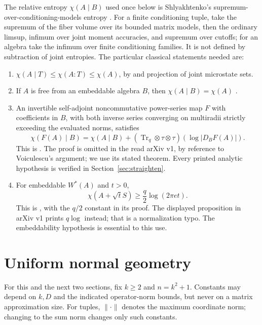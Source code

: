 \documentclass[11pt]{article}
\theoremstyle{definition}\newtheorem{definition}[theorem]{Definition}
\theoremstyle{remark}\newtheorem{remark}[theorem]{Remark}
\DeclareMathOperator{\Tr}{Tr}\DeclareMathOperator{\tr}{tr}
\begin{document}
The relative entropy $\chi(A\mid B)$ used once below is
Shlyakhtenko's supremum-over-conditioning-models entropy
\cite[Definition 2.3]{Shly}. For a finite conditioning tuple, take the
supremum of the fiber volume over its bounded matrix models, then the
ordinary limsup, infimum over joint moment accuracies, and supremum over
cutoffs; for an algebra take the infimum over finite conditioning
families. It is not defined by subtraction of joint entropies.
The particular classical statements needed are:
\begin{enumerate}[label=(\roman*)]
\item $\chi(A\mid T)\leq\chi(A:T)\leq\chi(A)$, by
\cite[Proposition 2.8]{Shly} and projection of joint microstate sets.
\item If $A$ is free from an embeddable algebra $B$, then
$\chi(A\mid B)=\chi(A)$ \cite[Theorem 2.19]{Shly}.
\item An invertible self-adjoint noncommutative power-series map $F$
with coefficients in $B$, with both inverse series converging on
multiradii strictly exceeding the evaluated norms, satisfies
\begin{equation}\label{eq:relative-cov}
 \chi(F(A)\mid B)=\chi(A\mid B)
 +(\Tr_q\otimes\tau\otimes\tau)(\log|D_BF(A)|).
\end{equation}
This is \cite[Theorem 4.1]{Shly}. The proof is omitted in the read arXiv
v1, by reference to Voiculescu's argument; we use its stated theorem.
Every printed analytic hypothesis is verified in
Section~\ref{sec:straighten}.
\item For embeddable $W^*(A)$ and $t>0$,
\begin{equation}\label{eq:gaussian-lower}
 \chi(A+\sqrt t S)\geq\frac q2\log(2\pi e t).
\end{equation}
This is \cite[Proposition 4.2]{Shly}, with the $q/2$ constant in its
proof. The displayed proposition in arXiv v1 prints $q\log$ instead;
that is a normalization typo. The embeddability hypothesis is essential
to this use.
\end{enumerate}

\section{Uniform normal geometry}
\label{sec:geometry}
For this and the next two sections, fix $k\geq2$ and $n=k^2+1$.
Constants may depend on $k,D$ and the indicated operator-norm bounds,
but never on a matrix approximation size. For tuples, $\|\cdot\|$
denotes the maximum coordinate norm; changing to the sum norm changes
only such constants.
\end{document}
